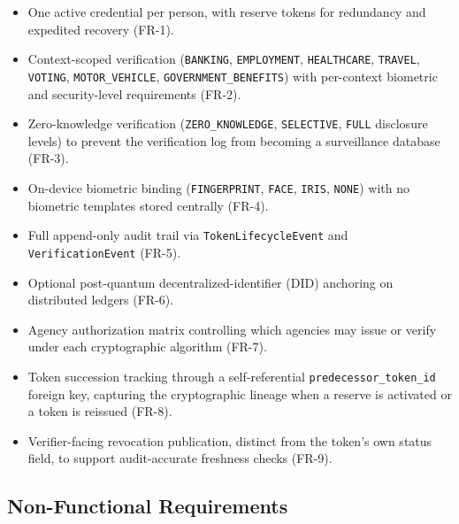 \documentclass[11pt,letterpaper]{article}
\newcommand{\entity}[1]{\texttt{\color{navydark}#1}}
\begin{document}
\begin{itemize}
  \item One active credential per person, with reserve tokens for redundancy and expedited recovery (FR-1).
  \item Context-scoped verification (\texttt{BANKING}, \texttt{EMPLOYMENT}, \texttt{HEALTHCARE}, \texttt{TRAVEL}, \texttt{VOTING}, \texttt{MOTOR\_VEHICLE}, \texttt{GOVERNMENT\_BENEFITS}) with per-context biometric and security-level requirements (FR-2).
  \item Zero-knowledge verification (\texttt{ZERO\_KNOWLEDGE}, \texttt{SELECTIVE}, \texttt{FULL} disclosure levels) to prevent the verification log from becoming a surveillance database (FR-3).
  \item On-device biometric binding (\texttt{FINGERPRINT}, \texttt{FACE}, \texttt{IRIS}, \texttt{NONE}) with no biometric templates stored centrally (FR-4).
  \item Full append-only audit trail via \entity{TokenLifecycleEvent} and \entity{VerificationEvent} (FR-5).
  \item Optional post-quantum decentralized-identifier (DID) anchoring on distributed ledgers (FR-6).
  \item Agency authorization matrix controlling which agencies may issue or verify under each cryptographic algorithm (FR-7).
  \item Token succession tracking through a self-referential \texttt{predecessor\_token\_id} foreign key, capturing the cryptographic lineage when a reserve is activated or a token is reissued (FR-8).
  \item Verifier-facing revocation publication, distinct from the token's own status field, to support audit-accurate freshness checks (FR-9).
\end{itemize}

\subsection{Non-Functional Requirements}
\end{document}
